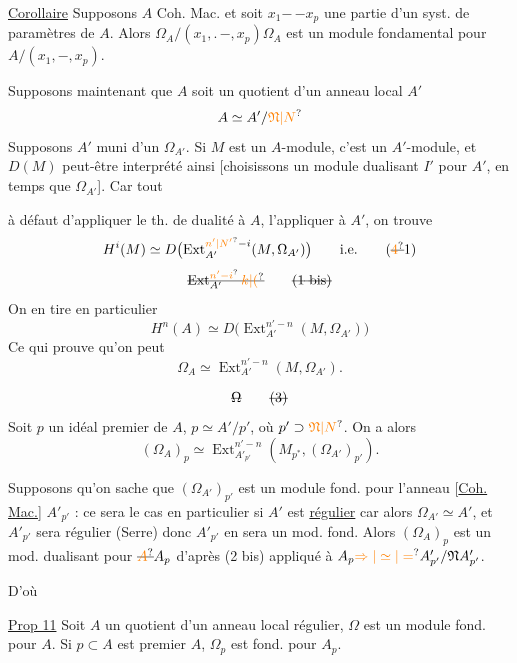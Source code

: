 \uline{Corollaire} Supposons $A$ Coh. Mac. et soit
$x_1\mathord{-}\,\mathord{-}x_p$ une partie d'un syst. de
paramètres de $A$. Alors $\Omega_A/(x_1,\mathord{.}\,\mathord{-},x_p)\Omega_A$ est
un module fondamental pour $A/(x_1,\mathord{-},x_p)$.

Supposons maintenant que $A$ soit un
quotient d'un anneau local  $A'$
\[
A\simeq A'/\unsure{\mathfrak N|N}
\]
Supposons $A'$ muni d'un $\Omega_{A'}$. Si
$M$ est un $A$-module, c'est un $A'$-module,
et $D(M)$ peut-être interprété ainsi
[choisissons un module dualisant $I'$  pour $A'$,
en \unsure{$=$|$\simeq$} temps que $\Omega_{A'}$]. Car tout 

\begingroup
\makeatletter\tagsleft@true\makeatother
à défaut d'appliquer le th. de dualité à $A$,
l'appliquer à $A'$, on trouve
\[
H^i(M)\simeq D\bigl(\operatorname{Ext}_{A'}^{\unsure{n'|N'}-i}(M,\Omega_{A'})\bigr)\qquad\text{i.e.}\tag*{(\deleted{\unsure{4}}1)}
\]
\[
\deleted{\operatorname{Ext}_{A'}^{\unsure{n'-i}}\unsure{k|(}}\tag*{\deleted{(1 bis)}}
\]
On en tire en particulier
\[
H^n(A)\simeq D\bigl(\operatorname{Ext}_{A'}^{n'-n}(M,\Omega_{A'})\bigr)\tag*{(2)}
\]
Ce qui prouve qu'on peut 
\[
\Omega_A\simeq\operatorname{Ext}_{A'}^{n'-n}(M,\Omega_{A'}).\tag*{(2 bis)}
\]


\[
\deleted{\Omega}\tag*{\deleted{(3)}}
\]
Soit $p$ un idéal premier de
$A$,  $p\simeq A'/p'$, où $p'\supset\unsure{\mathfrak N|N}$. On a
alors
\[
(\Omega_A)_p\simeq\operatorname{Ext}_{A'_{p'}}^{n'-n}
(M_{p^{*}},(\Omega_{A'})_{p'}).
\]

Supposons qu'on sache que $(\Omega_{A'})_{p'}$ est
un module fond. pour l'anneau
[\uline{Coh. Mac.}] $A'_{p'}$ : ce sera le cas en
particulier si $A'$ est \uline{régulier} car alors
$\Omega_{A'}\simeq A'$, et $A'_{p'}$ sera régulier (Serre)
donc $A'_{p'}$ en sera un mod. fond. Alors
$(\Omega_A)_p$ est un mod. dualisant pour $\deleted{\unsure{A}}A_p$
d'après (2 bis) appliqué à $A_p\unsure{\Rightarrow|\simeq|=}A'_{p'}/\mathfrak N A'_{p'}$.
\endgroup

\begingroup
\makeatletter\tagsleft@true\makeatother
D'où

\uline{Prop 11} Soit $A$ un quotient d'un anneau
local régulier,  $\Omega$ est un module fond.
pour $A$. Si $p\subset A$ est premier  $A$,
$\Omega_p$ est fond. pour $A_p$.

